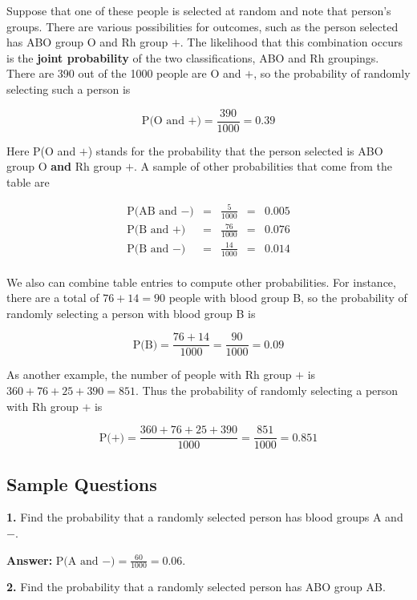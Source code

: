 \documentclass[
]{book}
\begin{document}
Suppose that one of these people is selected at random and note that person's groups.
There are various possibilities for outcomes, such as the person selected has
ABO group O and Rh group \(+\).
The likelihood that this combination occurs is the \textbf{joint probability} of the two classifications,
ABO and Rh groupings.
There are 390 out of the 1000 people are O and \(+\), so the probability of randomly
selecting such a person is

\[\text{P(O and +)} = \frac{390}{1000} = 0.39\]

Here P(O and \(+\)) stands for the probability that the person selected is
ABO group O \textbf{and} Rh group \(+\).
A sample of other probabilities that come from the table are

\[\begin{array}{rcccl}
\text{P(AB and }-) & = & {\displaystyle\frac{5}{1000}} & = & 0.005 \\[5pt]
\text{P(B and +)} & = & {\displaystyle\frac{76}{1000}} & = & 0.076 \\[5pt]
\text{P(B and }-) & = & {\displaystyle\frac{14}{1000}} & = & 0.014 \\
\end{array}\]

We also can combine table entries to compute other probabilities.
For instance, there are a total of \(76 + 14 = 90\) people with blood group B,
so the probability of randomly selecting a person with blood group B is

\[
\mbox{P(B)} = \frac{76+14}{1000} = \frac{90}{1000} = 0.09
\]

As another example, the number of people with
Rh group \(+\) is \(360 + 76 + 25 + 390 = 851\). Thus the probability of randomly selecting
a person with Rh group \(+\) is

\[
\mbox{P(+)} = \frac{360 + 76 + 25 + 390}{1000} = \frac{851}{1000} = 0.851
\]

\hypertarget{sample-questions-2}{%
\subsection{Sample Questions}\label{sample-questions-2}}

\textbf{1.} Find the probability that a randomly selected person has blood
groups A and \(-\).

\textbf{Answer:} \(\text{P(A and }-) = \frac{60}{1000} = 0.06\).

\textbf{2.} Find the probability that a randomly selected person has ABO group AB.
\end{document}
